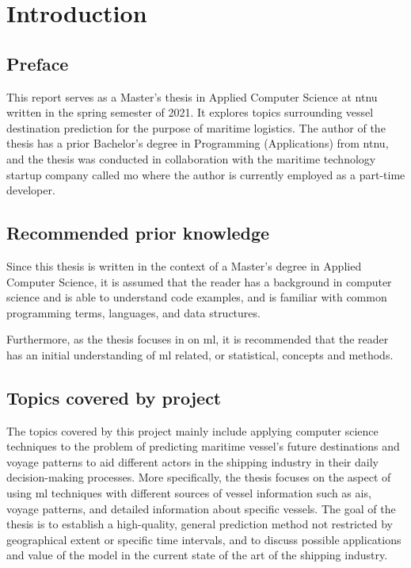 \chapter{Introduction}

\section{Preface}

This report serves as a Master's thesis in Applied Computer Science at \acrfull{ntnu} written in the spring semester of 2021. It explores topics surrounding vessel destination prediction for the purpose of maritime logistics. The author of the thesis has a prior Bachelor’s degree in Programming (Applications) from \acrshort{ntnu}, and the thesis was conducted in collaboration with the maritime technology startup company called \acrfull{mo} where the author is currently employed as a part-time developer.

\section{Recommended prior knowledge}

Since this thesis is written in the context of a Master's degree in Applied Computer Science, it is assumed that the reader has a background in computer science and is able to understand code examples, and is familiar with common programming terms, languages, and data structures.

Furthermore, as the thesis focuses in on \acrfull{ml}, it is recommended that the reader has an initial understanding of \acrshort{ml} related, or statistical, concepts and methods.

\section{Topics covered by project}
\label{sec:topics_covered}

The topics covered by this project mainly include applying computer science techniques to the problem of predicting maritime vessel's future destinations and \gls{voyage} patterns to aid different actors in the shipping industry in their daily decision-making processes. More specifically, the thesis focuses on the aspect of using \acrfull{ml} techniques with different sources of vessel information such as \acrfull{ais}, \gls{voyage} patterns, and detailed information about specific vessels. The goal of the thesis is to establish a high-quality, general prediction method not restricted by geographical extent or specific time intervals, and to discuss possible applications and value of the model in the current state of the art of the shipping industry.

